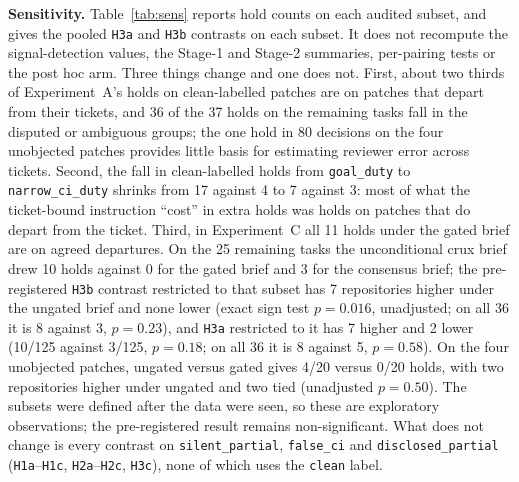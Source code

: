 \documentclass[11pt]{article}
\begin{document}
\textbf{Sensitivity.} Table~\ref{tab:sens} reports hold counts on each audited subset, and  gives the pooled \texttt{H3a} and \texttt{H3b} contrasts on each subset. It does not recompute the signal-detection values, the Stage-1 and Stage-2 summaries, per-pairing tests or the post hoc arm. Three things change and one does not. First, about two thirds of Experiment~A's holds on clean-labelled patches are on patches that depart from their tickets, and 36 of the 37 holds on the remaining tasks fall in the disputed or ambiguous groups; the one hold in 80 decisions on the four unobjected patches provides little basis for estimating reviewer error across tickets. Second, the fall in clean-labelled holds from \texttt{goal\_duty} to \texttt{narrow\_ci\_duty} shrinks from 17 against 4 to 7 against 3: most of what the ticket-bound instruction ``cost'' in extra holds was holds on patches that do depart from the ticket. Third, in Experiment~C all 11 holds under the gated brief are on agreed departures. On the 25 remaining tasks the unconditional crux brief drew 10 holds against 0 for the gated brief and 3 for the consensus brief; the pre-registered \texttt{H3b} contrast restricted to that subset has 7 repositories higher under the ungated brief and none lower (exact sign test \(p = 0.016\), unadjusted; on all 36 it is 8 against 3, \(p = 0.23\)), and \texttt{H3a} restricted to it has 7 higher and 2 lower (10/125 against 3/125, \(p = 0.18\); on all 36 it is 8 against 5, \(p = 0.58\)). On the four unobjected patches, ungated versus gated gives 4/20 versus 0/20 holds, with two repositories higher under ungated and two tied (unadjusted \(p = 0.50\)). The subsets were defined after the data were seen, so these are exploratory observations; the pre-registered result remains non-significant. What does not change is every contrast on \texttt{silent\_partial}, \texttt{false\_ci} and \texttt{disclosed\_partial} (\texttt{H1a}--\texttt{H1c}, \texttt{H2a}--\texttt{H2c}, \texttt{H3c}), none of which uses the \texttt{clean} label.
\end{document}
